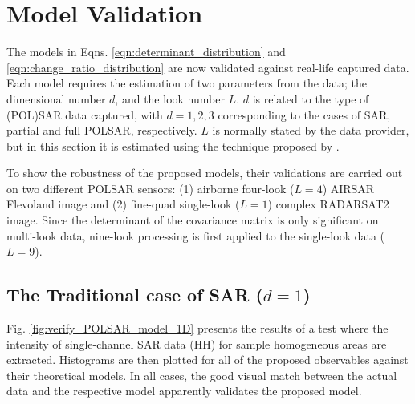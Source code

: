 \documentclass[printer]{tRSL2e}
\begin{document}

\section{Model Validation}
\label{sec:polsar_models_validation}

The models in Eqns. \ref{eqn:determinant_distribution} and \ref{eqn:change_ratio_distribution} are now validated against real-life captured data.
Each model requires the estimation of two parameters from the data; 
the dimensional number $d$, and  the look number $L$.
$d$ is related to the type of (POL)SAR data captured,
  with $d=1,2,3$ corresponding to the cases of SAR, partial and full POLSAR, respectively.
$L$ is normally stated by the data provider,
  but in this section it is estimated using the technique proposed by \citet{Anfinsen_2009_TGRS_3795}.

To show the robustness of the proposed models, 
  their validations are carried out on two different POLSAR sensors: (1) airborne four-look ($L=4$) AIRSAR Flevoland image and (2)
fine-quad single-look ($L=1$) complex RADARSAT2 image.
Since the determinant of the covariance matrix is only significant on multi-look data,
  nine-look processing is first applied to the single-look data ($L=9$).

\subsection{The Traditional case of SAR ($d=1$)}

Fig. \ref{fig:verify_POLSAR_model_1D} presents the results of a test where the intensity of single-channel SAR data (HH) for sample homogeneous areas are extracted.
Histograms are then plotted for all of the proposed observables %
against their theoretical models.
In all cases, the good visual match between the actual data and the respective model apparently validates the proposed model. %
\end{document}
